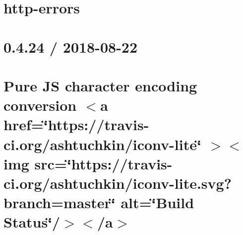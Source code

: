 \documentclass[twoside]{book}
\newcommand{\+}{\discretionary{\mbox{\scriptsize$\hookleftarrow$}}{}{}}
\begin{document}
\chapter{http-\/errors}
\label{md__c___users_vaishnavi_jadhav__desktop__developer_code_mean_stack_example_server_node_modules_http_errors__r_e_a_d_m_e}

\chapter{0.4.24 / 2018-\/08-\/22}
\label{md__c___users_vaishnavi_jadhav__desktop__developer_code_mean_stack_example_server_node_modules_iconv_lite__changelog}

\chapter{Pure JS character encoding conversion \texorpdfstring{$<$}{<}a href=\char`\"{}https\+://travis-\/ci.\+org/ashtuchkin/iconv-\/lite\char`\"{} \texorpdfstring{$>$}{>}\texorpdfstring{$<$}{<}img src=\char`\"{}https\+://travis-\/ci.\+org/ashtuchkin/iconv-\/lite.\+svg?branch=master\char`\"{} alt=\char`\"{}\+Build Status\char`\"{}/\texorpdfstring{$>$}{>}\texorpdfstring{$<$}{<}/a\texorpdfstring{$>$}{>}}
\label{md__c___users_vaishnavi_jadhav__desktop__developer_code_mean_stack_example_server_node_modules_iconv_lite__r_e_a_d_m_e}

\end{document}

